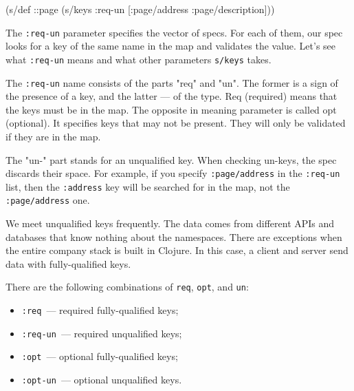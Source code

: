 \begin{english}
  \begin{clojure}
(s/def ::page
  (s/keys :req-un [:page/address
                   :page/description]))
  \end{clojure}
\end{english}


The \verb|:req-un| parameter specifies the vector of specs. For each of them, our spec looks for a key of the same name in the map and validates the value. Let's see what \verb|:req-un| means and what other parameters \verb|s/keys| takes.

The \verb|:req-un| name consists of the parts "req" and "un". The former is a sign of the presence of a key, and the latter — of the type. Req (required) means that the keys must be in the map. The opposite in meaning parameter is called opt (optional). It specifies keys that may not be present. They will only be validated if they are in the map.


The "un-" part stands for an unqualified key. When checking un-keys, the spec discards their space. For example, if you specify \verb|:page/address| in the \verb|:req-un| list, then the \verb|:address| key will be searched for in the map, not the \verb|:page/address| one.

We meet unqualified keys frequently. The data comes from different APIs and databases that know nothing about the namespaces. There are exceptions when the entire company stack is built in Clojure. In this case, a client and server send data with fully-qualified keys.

There are the following combinations of  \verb|req|, \verb|opt|, and \verb|un|:

\begin{itemize}

\item
  \verb|:req|~--- required fully-qualified keys;

\item
  \verb|:req-un|~--- required unqualified keys;


\item
  \verb|:opt|~--- optional fully-qualified keys;


\item
  \verb|:opt-un|~--- optional unqualified keys.

\end{itemize}

